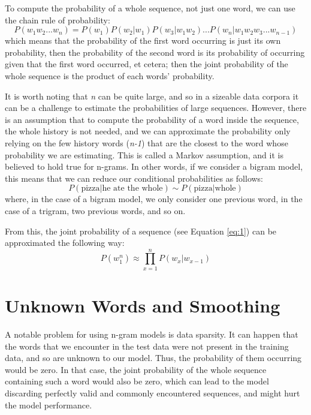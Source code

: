 To compute the probability of a whole sequence, not just one word, we can use the chain rule of probability:
\begin{equation}
    P(w_1w_2...w_n) = P(w_1)P(w_2|w_1)P(w_3|w_1w_2)...P(w_n|w_1w_2w_3...w_{n-1})\label{eq:1}
\end{equation}
which means that the probability of the first word occurring is just its own probability, then the probability of the second word is its probability of occurring given that the first word occurred, et cetera; then the joint probability of the whole sequence is the product of each words' probability.

It is worth noting that \textit{n} can be quite large, and so in a sizeable data corpora it can be a challenge to estimate the probabilities of large sequences. However, there is an assumption that to compute the probability of a word inside the sequence, the whole history is not needed, and we can approximate the probability only relying on the few history words (\textit{n-1}) that are the closest to the word whose probability we are estimating. This is called a Markov assumption, and it is believed to hold true for n-grams. In other words, if we consider a bigram model, this means that we can reduce our conditional probabilities as follows:
\begin{equation}
    P(\text{pizza}|\text{he ate the whole}) \sim P(\text{pizza}|\text{whole})
\end{equation}
where, in the case of a bigram model, we only consider one previous word, in the case of a trigram, two previous words, and so on.

From this, the joint probability of a sequence (see Equation \ref{eq:1}) can be approximated the following way:
\begin{equation}
    P(w_1^n) \approx \prod_{x=1}^n P(w_x|w_{x-1})
\end{equation}

\section{Unknown Words and Smoothing}
\label{sec:NgramBackground-Smoothing}
A notable problem for using n-gram models is data sparsity. It can happen that the words that we encounter in the test data were not present in the training data, and so are unknown to our model. Thus, the probability of them occurring would be zero. In that case, the joint probability of the whole sequence containing such a word would also be zero, which can lead to the model discarding perfectly valid and commonly encountered sequences, and might hurt the model performance.

